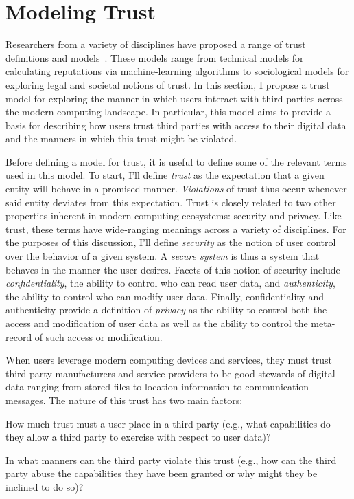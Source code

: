 \section{Modeling Trust}
\label{sec:model}

Researchers from a variety of disciplines have proposed a range of
trust definitions and models~\cite{camp2003, flowerday2006,
  grandison2000, sabater2005}. These models range from technical
models for calculating reputations via machine-learning algorithms to
sociological models for exploring legal and societal notions of
trust. In this section, I propose a trust model for exploring the
manner in which users interact with third parties across the modern
computing landscape. In particular, this model aims to provide a basis
for describing how users trust third parties with access to their
digital data and the manners in which this trust might be violated.

Before defining a model for trust, it is useful to define some of the
relevant terms used in this model. To start, I'll define
\textit{trust} as the expectation that a given entity will behave in a
promised manner. \textit{Violations} of trust thus occur whenever said
entity deviates from this expectation. Trust is closely related to two
other properties inherent in modern computing ecosystems: security and
privacy. Like trust, these terms have wide-ranging meanings across a
variety of disciplines. For the purposes of this discussion, I'll
define \textit{security} as the notion of user control over the
behavior of a given system. A \textit{secure system} is thus a system
that behaves in the manner the user desires. Facets of this notion of
security include \textit{confidentiality}, the ability to control who
can read user data, and \textit{authenticity}, the ability to control
who can modify user data. Finally, confidentiality and authenticity
provide a definition of \textit{privacy} as the ability to control
both the access and modification of user data as well as the ability
to control the meta-record of such access or modification.

When users leverage modern computing devices and services, they must
trust third party manufacturers and service providers to be good
stewards of digital data ranging from stored files to location
information to communication messages. The nature of this trust has
two main factors:

\begin{packed_desc}
\item[Degree:] How much trust must a user place in a third party
  (e.g., what capabilities do they allow a third party to exercise
  with respect to user data)?
\item[Violation:] In what manners can the third party violate this
  trust (e.g., how can the third party abuse the capabilities they
  have been granted or why might they be inclined to do so)?
\end{packed_desc}

